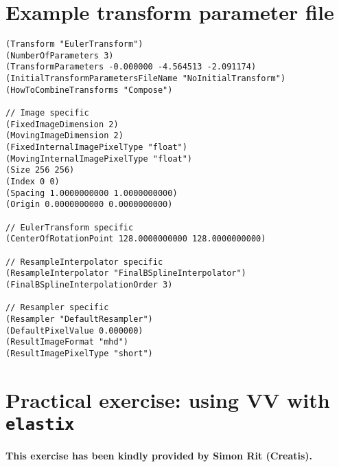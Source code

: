 \documentclass[]{report}
\newcommand{\elastix}{\texttt{elastix}}
\begin{document}

\chapter{Example transform parameter file}\label{chp:ExampleTransformParam}

\small
\begin{verbatim}
(Transform "EulerTransform")
(NumberOfParameters 3)
(TransformParameters -0.000000 -4.564513 -2.091174)
(InitialTransformParametersFileName "NoInitialTransform")
(HowToCombineTransforms "Compose")

// Image specific
(FixedImageDimension 2)
(MovingImageDimension 2)
(FixedInternalImagePixelType "float")
(MovingInternalImagePixelType "float")
(Size 256 256)
(Index 0 0)
(Spacing 1.0000000000 1.0000000000)
(Origin 0.0000000000 0.0000000000)

// EulerTransform specific
(CenterOfRotationPoint 128.0000000000 128.0000000000)

// ResampleInterpolator specific
(ResampleInterpolator "FinalBSplineInterpolator")
(FinalBSplineInterpolationOrder 3)

// Resampler specific
(Resampler "DefaultResampler")
(DefaultPixelValue 0.000000)
(ResultImageFormat "mhd")
(ResultImagePixelType "short")
\end{verbatim}
\normalsize

\chapter{Practical exercise: using VV with \elastix}\label{chp:vvtutorial}

\textbf{This exercise has been kindly provided by Simon Rit (Creatis).}
\end{document}
